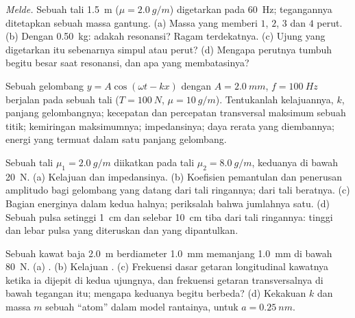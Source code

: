 \begin{exercise}[$\star\star$]\label{exo:b2:waves-on-strings:6}
\emph{Melde.} Sebuah tali \qty{1.5}{m} ($\mu = \qty{2.0}{g/m}$) digetarkan pada
\qty{60}{Hz}; tegangannya ditetapkan sebuah massa gantung. (a) Massa yang memberi
$1$, $2$, $3$ dan $4$ perut. (b) Dengan \qty{0.50}{kg}: adakah resonansi?
Ragam terdekatnya. (c) Ujung yang digetarkan itu sebenarnya simpul atau perut?
(d) Mengapa perutnya tumbuh begitu besar saat resonansi, dan apa yang membatasinya?
\end{exercise}

\begin{exercise}[$\star\star$]\label{exo:b2:waves-on-strings:7}
Sebuah gelombang $y = A\cos(\omega t - kx)$ dengan $A = \qty{2.0}{mm}$, $f = \qty{100}{Hz}$
berjalan pada sebuah tali ($T = \qty{100}{N}$, $\mu = \qty{10}{g/m}$). Tentukanlah kelajuannya, $k$,
panjang gelombangnya; kecepatan dan percepatan transversal maksimum sebuah titik;
kemiringan maksimumnya; impedansinya; daya rerata yang diembannya; energi yang termuat dalam satu
panjang gelombang.
\end{exercise}

\begin{exercise}[$\star\star$]\label{exo:b2:waves-on-strings:8}
Sebuah tali $\mu_1 = \qty{2.0}{g/m}$ diikatkan pada tali $\mu_2 = \qty{8.0}{g/m}$,
keduanya di bawah \qty{20}{N}. (a) Kelajuan dan impedansinya. (b) Koefisien
pemantulan dan penerusan amplitudo bagi gelombang yang datang dari
tali ringannya; dari tali beratnya. (c) Bagian energinya dalam kedua
halnya; periksalah bahwa jumlahnya satu. (d) Sebuah pulsa setinggi \qty{1}{cm} dan selebar \qty{10}{cm}
tiba dari tali ringannya: tinggi dan lebar pulsa yang diteruskan dan
yang dipantulkan.
\end{exercise}

\begin{exercise}[$\star\star$]\label{exo:b2:waves-on-strings:9}
Sebuah kawat baja \qty{2.0}{m} berdiameter \qty{1.0}{mm} memanjang \qty{1.0}{mm}
di bawah \qty{80}{N}. (a) . (b) Kelajuan .
(c) Frekuensi dasar getaran longitudinal kawatnya ketika ia
dijepit di kedua ujungnya, dan frekuensi getaran transversalnya di bawah tegangan itu;
mengapa keduanya begitu berbeda? (d) Kekakuan $k$ dan massa $m$ sebuah
``atom'' dalam model rantainya, untuk $a = \qty{0.25}{nm}$.
\end{exercise}

